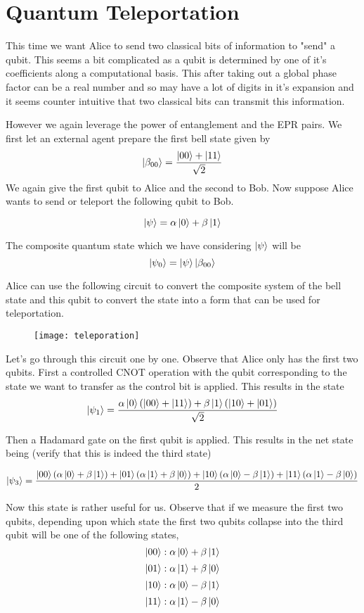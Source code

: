 \chapter{Quantum Teleportation}

This time we want Alice to send two classical bits of information to "send" a qubit. This seems a bit complicated as a qubit is determined by one of it's coefficients along a computational basis. This after taking out a global phase factor can be a real number and so may have a lot of digits in it's expansion and it seems counter intuitive that two classical bits can transmit this information.

However we again leverage the power of entanglement and the EPR pairs. We first let an external agent prepare the first bell state given by
$$ \ket{\beta_{00}} = \frac{\ket{00} + \ket{11}}{\sqrt{2}}$$
We again give the first qubit to Alice and the second to Bob. Now suppose Alice wants to send or teleport the following qubit to Bob.

$$ \ket{\psi} = \alpha\ket{0} + \beta\ket{1}$$

The composite quantum state which we have considering $\ket{\psi}$ will be $$\ket{\psi_{0}} = \ket{\psi}\ket{\beta_{00}}$$

Alice can use the following circuit to convert the composite system of the bell state and this qubit to convert the state into a form that can be used for teleportation. 
\begin{figure}[htp]
    \texttt{[image: teleporation]}
\end{figure}

Let's go through this circuit one by one. Observe that Alice only has the first two qubits. First a controlled CNOT operation with the qubit corresponding to the state we want to transfer as the control bit is applied.
This results in the state 
$$ \ket{\psi_1} = \frac{\alpha\ket{0}(\ket{00} + \ket{11}) + \beta\ket{1}(\ket{10} + \ket{01})}{\sqrt{2}}$$

Then a Hadamard gate on the first qubit is applied. This results in the net state being (verify that this is indeed the third state)

$$ \ket{\psi_3} = \frac{\ket{00}(\alpha\ket{0} + \beta\ket{1}) + \ket{01}(\alpha\ket{1} + \beta\ket{0}) + \ket{10}(\alpha\ket{0} - \beta\ket{1}) + \ket{11}(\alpha\ket{1} - \beta\ket{0})}{2}$$

Now this state is rather useful for us. Observe that if we measure the first two qubits, depending upon which state the first two qubits collapse into the third qubit will be one of the following states,
$$ \ket{00} : \alpha\ket{0} + \beta\ket{1}$$
$$ \ket{01} : \alpha\ket{1} + \beta\ket{0}$$
$$ \ket{10} : \alpha\ket{0} - \beta\ket{1}$$
$$ \ket{11} : \alpha\ket{1} - \beta\ket{0}$$

